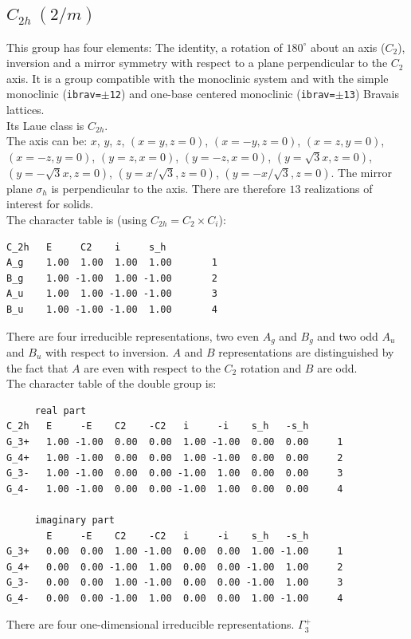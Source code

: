 \documentclass[12pt,a4paper]{article}
\begin{document}
\subsection{\color{web-blue}$C_{2h}\ (2/m)$} 
This group has four elements: The identity, a rotation of $180^\circ$ 
about an axis ($C_2$), inversion and a mirror symmetry with respect to 
a plane perpendicular to the $C_2$ axis.
It is a group compatible with the monoclinic system and with the  
simple monoclinic (\texttt{ibrav=$\pm$12}) and one-base centered monoclinic
(\texttt{ibrav=$\pm$13}) Bravais lattices. \\ 
Its Laue class is $C_{2h}$. \\
The axis can be:
$x$, $y$, $z$, $(x=y, z=0)$, $(x=-y, z=0)$, $(x=z, y=0)$, $(x=-z, y=0)$,
$(y=z, x=0)$, $(y=-z, x=0)$, $(y=\sqrt{3}x, z=0)$, $(y=-\sqrt{3}x, z=0)$,
$(y=x/\sqrt{3}, z=0)$, $(y=-x/\sqrt{3}, z=0)$. The mirror plane $\sigma_h$ 
is perpendicular to the axis. There are therefore $13$ realizations 
of interest for solids. \\
The character table is (using $C_{2h}=C_2 \times C_i$):
\begin{verbatim}
C_2h   E     C2    i     s_h
A_g    1.00  1.00  1.00  1.00       1
B_g    1.00 -1.00  1.00 -1.00       2
A_u    1.00  1.00 -1.00 -1.00       3
B_u    1.00 -1.00 -1.00  1.00       4
\end{verbatim}
There are four irreducible representations, two even $A_g$ and $B_g$ and
two odd $A_u$ and $B_u$ with respect to inversion. $A$ and $B$ representations
are distinguished by the fact that $A$ are even with respect
to the $C_2$ rotation and $B$ are odd. \\
The character table of the double group is:
\begin{verbatim}
     real part
C_2h   E     -E    C2    -C2   i     -i    s_h   -s_h 
G_3+   1.00 -1.00  0.00  0.00  1.00 -1.00  0.00  0.00     1
G_4+   1.00 -1.00  0.00  0.00  1.00 -1.00  0.00  0.00     2
G_3-   1.00 -1.00  0.00  0.00 -1.00  1.00  0.00  0.00     3
G_4-   1.00 -1.00  0.00  0.00 -1.00  1.00  0.00  0.00     4

     imaginary part
       E     -E    C2    -C2   i     -i    s_h   -s_h 
G_3+   0.00  0.00  1.00 -1.00  0.00  0.00  1.00 -1.00     1
G_4+   0.00  0.00 -1.00  1.00  0.00  0.00 -1.00  1.00     2
G_3-   0.00  0.00  1.00 -1.00  0.00  0.00 -1.00  1.00     3
G_4-   0.00  0.00 -1.00  1.00  0.00  0.00  1.00 -1.00     4
\end{verbatim}
There are four one-dimensional irreducible representations. $\Gamma_3^+$
\end{document}
